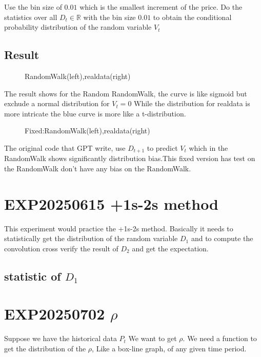 \documentclass{article}
\theoremstyle{definition} %
\begin{document}
Use the bin size of $0.01$ which is the smallest
increment of the price. Do the statistics over
all $D_t\in\mathbb{R}$ with the bin size $0.01$
to obtain the conditional probability distribution
of the random variable $V_t$

\subsection{Result}
\begin{figure}[!ht]
    \centering
    \caption{RandomWalk(left),realdata(right)}
\end{figure}
The result shows for the Random RandomWalk, the
curve is like sigmoid but exchude a normal
distribution for $V_t=0$
While the distribution for realdata is more
intricate the blue curve is more like a
t-distribution.
\begin{figure}[!ht]
    \centering
    \caption{Fixed:RandomWalk(left),realdata(right)}
\end{figure}

The original code that GPT write, use $D_{t+1}$
to predict $V_t$ which in the RandomWalk shows
significantly distribution bias.This fixed version
has test on the RandomWalk don't have any bias
on the RandomWalk.


\section{EXP20250615 +1s-2s method}
This experiment would practice the
+1s-2s method.
Basically it needs to statistically get
the distribution of the random variable
$D_1$ and to compute the convolution
cross verify the result of $D_2$
and get the expectation.

\subsection[statistic D1]{statistic of $D_1$}

\section[EXP20250702 ρ]{EXP20250702 $\rho$}
Suppose we have the historical data $P_t$
We want to get $\rho$.
We need a function to get the distribution
of the $\rho$, Like a box-line graph, of any
given time period.



\end{document}
